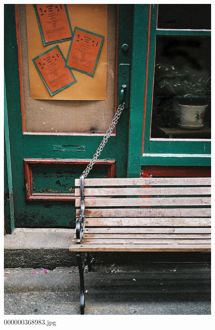     \begin{figure}[h]
        \centering
        \includegraphics[width=0.8\linewidth]{../image set/easy/000000368983.jpg}
        \caption{000000368983.jpg}
    \end{figure}
